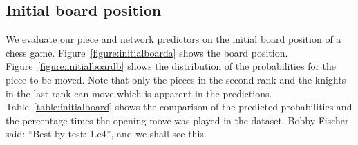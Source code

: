 \subsection{Initial board position}
We evaluate our piece and network predictors on the initial board position of a 
chess game. Figure~\ref{figure:initialboarda} shows the board position. 
Figure~\ref{figure:initialboardb} shows the distribution of the 
probabilities for the piece to be moved. Note that only the pieces in the second 
rank and the knights in the last rank can move which is apparent in the 
predictions. Table~\ref{table:initialboard} shows the comparison of the 
predicted probabilities and the percentage times the opening move was played in 
the dataset. Bobby Fischer said: ``Best by test: 1.e4'', and we shall 
see this.

